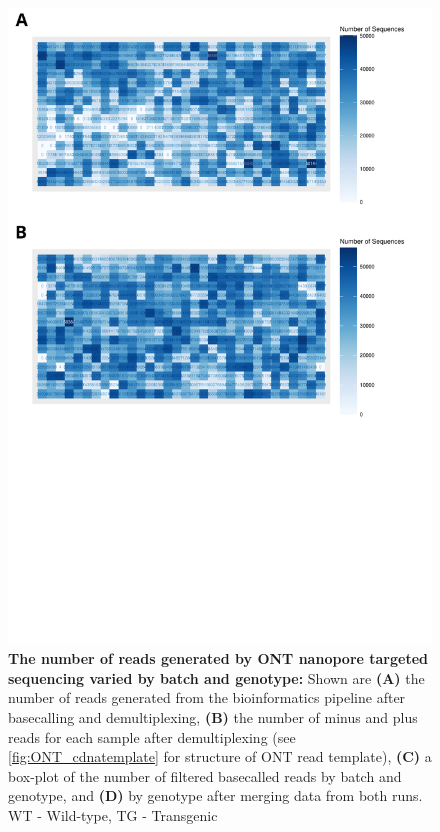 \begin{figure}[!htp]
	\centering
	\includegraphics[page=4,trim={0 0 0 0},clip,scale = 0.55]{Figures/ONTTargetedTranscriptome.pdf}
	\captionsetup{width=0.95\textwidth}
	\caption[ONT Targeted Transcriptome run performance]%
	{\textbf{The number of reads generated by ONT nanopore targeted sequencing varied by batch and genotype:} Shown are \textbf{(A)} the number of reads generated from the bioinformatics pipeline after basecalling and demultiplexing, \textbf{(B)} the number of minus and plus reads for each sample after demultiplexing (see \cref{fig:ONT_cdnatemplate} for structure of ONT read template), \textbf{(C)} a box-plot of the number of filtered basecalled reads by batch and genotype, and  \textbf{(D)} by genotype after merging data from both runs. WT - Wild-type, TG - Transgenic }
	\label{fig:ONT_targeted_run_output}
\end{figure}

